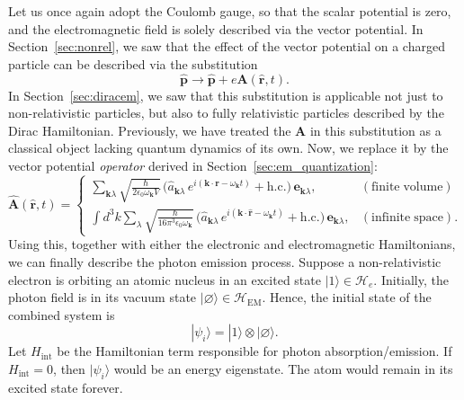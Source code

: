 \documentclass[pra,12pt]{revtex4}
\begin{document}
Let us once again adopt the Coulomb gauge, so that the scalar
potential is zero, and the electromagnetic field is solely described
via the vector potential.  In Section~\ref{sec:nonrel}, we saw that
the effect of the vector potential on a charged particle can be
described via the substitution
\begin{equation}
  \hat{\mathbf{p}} \rightarrow \hat{\mathbf{p}} +
  e\mathbf{A}(\hat{\mathbf{r}},t).
\end{equation}
In Section~\ref{sec:diracem}, we saw that this substitution is
applicable not just to non-relativistic particles, but also to fully
relativistic particles described by the Dirac Hamiltonian.
Previously, we have treated the $\mathbf{A}$ in this substitution as a
classical object lacking quantum dynamics of its own.  Now, we replace
it by the vector potential \textit{operator} derived in
Section~\ref{sec:em_quantization}:
\begin{equation}
  \hat{\mathbf{A}}(\hat{\mathbf{r}},t) =
  \begin{cases}
    \displaystyle
    \sum_{\mathbf{k}\lambda} 
  \sqrt{\frac{\hbar}{2\epsilon_0\omega_{\mathbf{k}}V}}\,
  \Big(\hat{a}_{\mathbf{k}\lambda} \, e^{i(\mathbf{k}\cdot\mathbf{r} - \omega_{\mathbf{k}} t)}
  + \mathrm{h.c.}\Big)\, \mathbf{e}_{\mathbf{k}\lambda}, & (\mathrm{finite}\;\mathrm{volume}) \\
  \displaystyle \int d^3k \sum_{\lambda} 
  \sqrt{\frac{\hbar}{16\pi^3\epsilon_0\omega_{\mathbf{k}}}}\,
  \Big(\hat{a}_{\mathbf{k}\lambda} \, e^{i(\mathbf{k}\cdot\hat{\mathbf{r}} - \omega_{\mathbf{k}} t)}
  + \mathrm{h.c.}\Big)\, \mathbf{e}_{\mathbf{k}\lambda},
  & (\mathrm{infinite}\;\mathrm{space}).
  \end{cases}
  \label{Aoperator}
\end{equation}
Using this, together with either the electronic and electromagnetic
Hamiltonians, we can finally describe the photon emission process.
Suppose a non-relativistic electron is orbiting an atomic nucleus in
an excited state $|1\rangle \in \mathscr{H}_e$.  Initially, the photon
field is in its vacuum state $|\varnothing\rangle \in
\mathscr{H}_{\mathrm{EM}}$.  Hence, the initial state of the combined
system is
\begin{equation}
  |\psi_i\rangle = |1\rangle \otimes |\varnothing\rangle.
\end{equation}
Let $H_{\mathrm{int}}$ be the Hamiltonian term responsible for photon
absorption/emission.  If $H_{\mathrm{int}} = 0$, then $|\psi_i\rangle$
would be an energy eigenstate.  The atom would remain in its excited
state forever.
\end{document}

